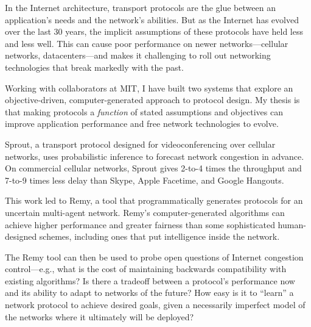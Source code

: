 % 
% 
%
In the Internet architecture, transport protocols are the glue between
an application's needs and the network's abilities. But as the
Internet has evolved over the last 30 years, the implicit assumptions
of these protocols have held less and less well. This can cause poor
performance on newer networks---cellular networks, datacenters---and
makes it challenging to roll out networking technologies that break
markedly with the past.

Working with collaborators at MIT, I have built two systems that
explore an objective-driven, computer-generated approach to protocol
design. My thesis is that making protocols a \emph{function} of stated
assumptions and objectives can improve application performance and
free network technologies to evolve.

Sprout, a transport protocol designed for videoconferencing over
cellular networks, uses probabilistic inference to forecast network
congestion in advance. On commercial cellular networks, Sprout gives
2-to-4 times the throughput and 7-to-9 times less delay than Skype,
Apple Facetime, and Google Hangouts.

This work led to Remy, a tool that programmatically generates
protocols for an uncertain multi-agent network. Remy's
computer-generated algorithms can achieve higher performance and
greater fairness than some sophisticated human-designed schemes,
including ones that put intelligence inside the network.

The Remy tool can then be used to probe open questions of Internet
congestion control---e.g., what is the cost of maintaining backwards
compatibility with existing algorithms? Is there a tradeoff between a
protocol's performance now and its ability to adapt to networks of the
future? How easy is it to ``learn'' a network protocol to achieve
desired goals, given a necessarily imperfect model of the networks
where it ultimately will be deployed?

